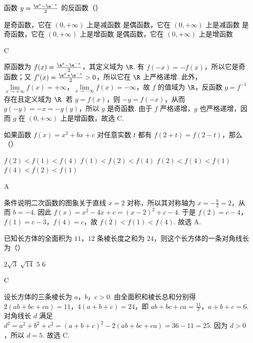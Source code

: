 \begin{problem}
函数 \(y=\frac{\e^x-\e^{-x}}{2}\) 的反函数（\quad）

\choices
    {是奇函数，它在 \((0, +\infty)\) 上是减函数}
    {是偶函数，它在 \((0, +\infty)\) 上是减函数}
    {是奇函数，它在 \((0, +\infty)\) 上是增函数}
    {是偶函数，它在 \((0, +\infty)\) 上是增函数}

\begin{answer}
C
\end{answer}

\begin{solution}
原函数为 \(f(x)=\frac{\e^x-\e^{-x}}{2}\)，其定义域为 \(\R\). 有 \(f(-x)=-f(x)\)，所以它是奇函数；又 \(f'(x)=\frac{\e^x+\e^{-x}}{2}>0\)，所以它在 \(\R\) 上严格递增. 此外，\(\displaystyle\lim\limits_{x\to+\infty}f(x)=+\infty\)，\(\displaystyle\lim\limits_{x\to-\infty}f(x)=-\infty\)，故 \(f\) 的值域为 \(\R\)，反函数 \(g=f^{-1}\) 存在且定义域为 \(\R\). 若 \(y=f(x)\)，则 \(-y=f(-x)\)，从而 \(g(-y)=-x=-g(y)\)，所以 \(g\) 是奇函数. 由于 \(f\) 严格递增，\(g\) 也严格递增，因而 \(g\) 在 \((0,+\infty)\) 上是增函数，故选 C.
\end{solution}
\end{problem}

\begin{problem}
如果函数 \(f(x)=x^2+bx+c\) 对任意实数 \(t\) 都有 \(f(2+t)=f(2-t)\)，那么（\quad）

\choices
    {\(f(2) < f(1) < f(4)\)}
    {\(f(1) < f(2) < f(4)\)}
    {\(f(2) < f(4) < f(1)\)}
    {\(f(4) < f(2) < f(1)\)}

\begin{answer}
A
\end{answer}

\begin{solution}
条件说明二次函数的图象关于直线 \(x=2\) 对称，所以其对称轴为 \(x=-\frac{b}{2}=2\)，从而 \(b=-4\). 因此 \(f(x)=x^2-4x+c=(x-2)^2+c-4\). 于是 \(f(2)=c-4\)，\(f(1)=c-3\)，\(f(4)=c\)，故 \(f(2)<f(1)<f(4)\). 故选 A.
\end{solution}
\end{problem}

\begin{problem}
已知长方体的全面积为 \(11\)，\(12\) 条棱长度之和为 \(24\)，则这个长方体的一条对角线长为（\quad）

\choices
    {\(2\sqrt{3}\)}
    {\(\sqrt{14}\)}
    {\(5\)}
    {\(6\)}

\begin{answer}
C
\end{answer}

\begin{solution}
设长方体的三条棱长为 \(a\)，\(b\)，\(c>0\). 由全面积和棱长总和分别得 \(2(ab+bc+ca)=11\)，\(4(a+b+c)=24\)，即 \(ab+bc+ca=\frac{11}{2}\)，\(a+b+c=6\). 对角线长 \(d\) 满足
\(d^2=a^2+b^2+c^2=(a+b+c)^2-2(ab+bc+ca)=36-11=25\). 因为 \(d>0\)，所以 \(d=5\). 故选 C.
\end{solution}
\end{problem}

